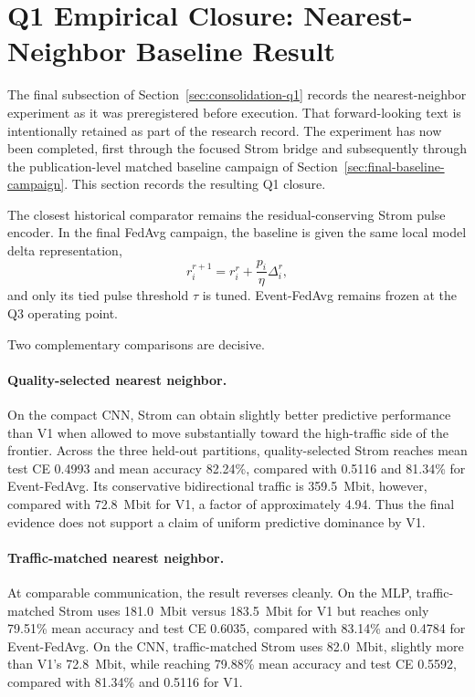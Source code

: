 \section{Q1 Empirical Closure: Nearest-Neighbor Baseline Result}
\label{sec:q1-empirical-closure}

The final subsection of Section~\ref{sec:consolidation-q1} records the nearest-neighbor experiment as it was preregistered before execution. That forward-looking text is intentionally retained as part of the research record. The experiment has now been completed, first through the focused Strom bridge and subsequently through the publication-level matched baseline campaign of Section~\ref{sec:final-baseline-campaign}. This section records the resulting Q1 closure.

The closest historical comparator remains the residual-conserving Strom pulse encoder. In the final FedAvg campaign, the baseline is given the same local model delta representation,
\begin{equation}
    r_i^{r+1}=r_i^r+\frac{p_i}{\eta}\Delta_i^r,
\end{equation}
and only its tied pulse threshold $\tau$ is tuned. Event-FedAvg remains frozen at the Q3 operating point.

Two complementary comparisons are decisive.

\paragraph{Quality-selected nearest neighbor.}
On the compact CNN, Strom can obtain slightly better predictive performance than V1 when allowed to move substantially toward the high-traffic side of the frontier. Across the three held-out partitions, quality-selected Strom reaches mean test CE 0.4993 and mean accuracy 82.24\%, compared with 0.5116 and 81.34\% for Event-FedAvg. Its conservative bidirectional traffic is 359.5~Mbit, however, compared with 72.8~Mbit for V1, a factor of approximately 4.94. Thus the final evidence does not support a claim of uniform predictive dominance by V1.

\paragraph{Traffic-matched nearest neighbor.}
At comparable communication, the result reverses cleanly. On the MLP, traffic-matched Strom uses 181.0~Mbit versus 183.5~Mbit for V1 but reaches only 79.51\% mean accuracy and test CE 0.6035, compared with 83.14\% and 0.4784 for Event-FedAvg. On the CNN, traffic-matched Strom uses 82.0~Mbit, slightly more than V1's 72.8~Mbit, while reaching 79.88\% mean accuracy and test CE 0.5592, compared with 81.34\% and 0.5116 for V1.

